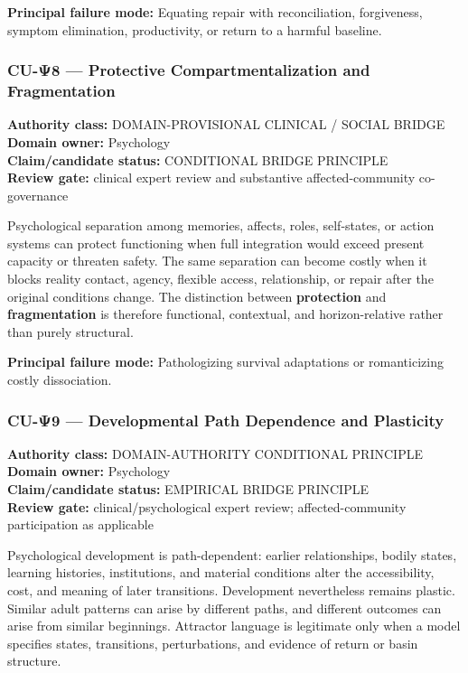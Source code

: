 \documentclass[
  11pt,
]{article}
\begin{document}
\textbf{Principal failure mode:} Equating repair with reconciliation,
forgiveness, symptom elimination, productivity, or return to a harmful
baseline.

\subsubsection{CU-Ψ8 --- Protective Compartmentalization and
Fragmentation}\label{cu-ux3c88-protective-compartmentalization-and-fragmentation}

\textbf{Authority class:} DOMAIN-PROVISIONAL CLINICAL / SOCIAL BRIDGE\\
\textbf{Domain owner:} Psychology\\
\textbf{Claim/candidate status:} CONDITIONAL BRIDGE PRINCIPLE\\
\textbf{Review gate:} clinical expert review and substantive
affected-community co-governance

Psychological separation among memories, affects, roles, self-states, or
action systems can protect functioning when full integration would
exceed present capacity or threaten safety. The same separation can
become costly when it blocks reality contact, agency, flexible access,
relationship, or repair after the original conditions change. The
distinction between \textbf{protection} and \textbf{fragmentation} is
therefore functional, contextual, and horizon-relative rather than
purely structural.

\textbf{Principal failure mode:} Pathologizing survival adaptations or
romanticizing costly dissociation.

\subsubsection{CU-Ψ9 --- Developmental Path Dependence and
Plasticity}\label{cu-ux3c89-developmental-path-dependence-and-plasticity}

\textbf{Authority class:} DOMAIN-AUTHORITY CONDITIONAL PRINCIPLE\\
\textbf{Domain owner:} Psychology\\
\textbf{Claim/candidate status:} EMPIRICAL BRIDGE PRINCIPLE\\
\textbf{Review gate:} clinical/psychological expert review;
affected-community participation as applicable

Psychological development is path-dependent: earlier relationships,
bodily states, learning histories, institutions, and material conditions
alter the accessibility, cost, and meaning of later transitions.
Development nevertheless remains plastic. Similar adult patterns can
arise by different paths, and different outcomes can arise from similar
beginnings. Attractor language is legitimate only when a model specifies
states, transitions, perturbations, and evidence of return or basin
structure.
\end{document}

